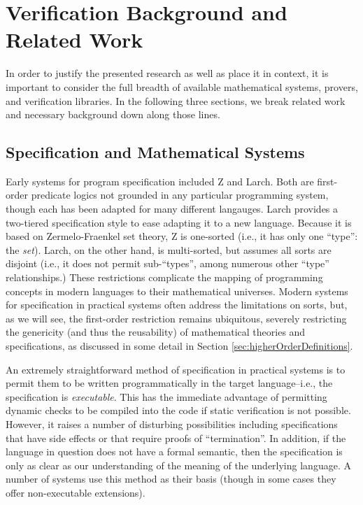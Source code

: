 \chapter{Verification Background and Related Work}\label{sec:background}

In order to justify the presented research as well as place it in context, it is important to consider the full breadth of available mathematical systems, provers, and verification libraries.  In the following three sections, we break related work and necessary background down along those lines.

\section{Specification and Mathematical Systems}\label{sec:overviewSpec}
Early systems for program specification included Z\cite{dillerZ} and Larch\cite{guttagLarch}.  Both are first-order predicate logics not grounded in any particular programming system, though each has been adapted for many different langauges.  Larch provides a two-tiered specification style to ease adapting it to a new language.  Because it is based on Zermelo-Fraenkel set theory, Z is one-sorted (i.e., it has only one ``type'': the \emph{set}).  Larch, on the other hand, is multi-sorted, but assumes all sorts are disjoint (i.e., it does not permit sub-``types'', among numerous other ``type'' relationships.)  These restrictions complicate the mapping of programming concepts in modern languages to their mathematical universes.  Modern systems for specification in practical systems often address the limitations on sorts, but, as we will see, the first-order restriction remains ubiquitous, severely restricting the genericity (and thus the reusability) of mathematical theories and specifications, as discussed in some detail in Section \ref{sec:higherOrderDefinitions}.

An extremely straightforward method of specification in practical systems is to permit them to be written programmatically in the target language--i.e., the specification is \emph{executable}.  This has the immediate advantage of permitting dynamic checks to be compiled into the code if static verification is not possible.  However, it raises a number of disturbing possibilities including specifications that have side effects or that require proofs of ``termination''.  In addition, if the language in question does not have a formal semantic, then the specification is only as clear as our understanding of the meaning of the underlying language.  A number of systems use this method as their basis (though in some cases they offer non-executable extensions).

